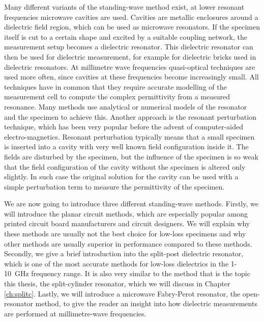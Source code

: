 Many different variants of the standing-wave method exist, at lower resonant frequencies microwave cavities are used. Cavities are metallic enclosures around a dielectric field region, which can be used as microwave resonators. If the specimen itself is cut to a certain shape and excited by a suitable coupling network, the measurement setup becomes a dielectric resonator. This dielectric resonator can then be used for dielectric measurement, for example for dielectric bricks used in dielectric resonators. At millimetre wave frequencies quasi-optical techniques are used more often, since cavities at these frequencies become increasingly small. All techniques have in common that they require accurate modelling of the measurement cell to compute the complex permittivity from a measured resonance. Many methods use analytical or numerical models of the resonator and the specimen to achieve this. Another approach is the resonant perturbation technique, which has been very popular before the advent of computer-aided electro-magnetics. Resonant perturbation typically means that a small specimen is inserted into a cavity with very well known field configuration inside it. The fields are disturbed by the specimen, but the influence of the specimen is so weak that the field configuration of the cavity without the specimen is altered only slightly. In such case the original solution for the cavity can be used with a simple perturbation term to measure the permittivity of the specimen.

We are now going to introduce three different standing-wave methods. Firstly, we will introduce the planar circuit methods, which are especially popular among printed circuit board manufacturers and circuit designers. We will explain why these methods are usually not the best choice for low-loss specimens and why other methods are usually superior in performance compared to these methods. Secondly, we give a brief introduction into the split-post dielectric resonator, which is one of the most accurate methods for low-loss dielectrics in the 1-\SI{10}{\giga\hertz} frequency range. It is also very similar to the method that is the topic this thesis, the split-cylinder resonator, which we will discuss in Chapter \ref{ch:splitc}. Lastly, we will introduce a microwave Fabry-Perot resonator, the open-resonator method, to give the reader an insight into how dielectric measurements are performed at millimetre-wave frequencies.

